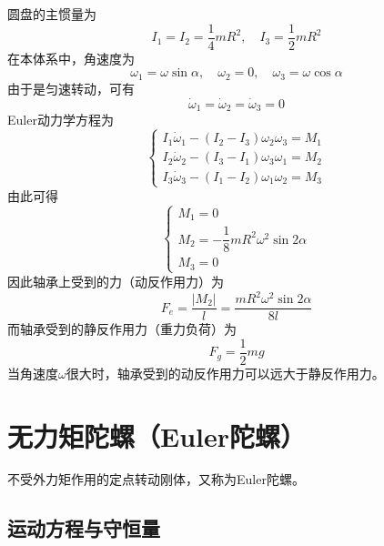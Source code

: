 \begin{solution}
圆盘的主惯量为
\begin{equation*}
	I_1 = I_2 = \frac14 mR^2,\quad I_3 = \frac12 mR^2
\end{equation*}
在本体系中，角速度为
\begin{equation*}
	\omega_1 = \omega \sin \alpha,\quad \omega_2 = 0,\quad \omega_3 = \omega \cos \alpha
\end{equation*}
由于是匀速转动，可有
\begin{equation*}
	\dot{\omega}_1 = \dot{\omega}_2 = \dot{\omega}_3 = 0
\end{equation*}
Euler动力学方程为
\begin{equation*}
	\begin{cases}
		I_1 \dot{\omega}_1 - (I_2-I_3)\omega_2 \omega_3 = M_1 \\
		I_2 \dot{\omega}_2 - (I_3-I_1)\omega_3 \omega_1 = M_2 \\
		I_3 \dot{\omega}_3 - (I_1-I_2)\omega_1 \omega_2 = M_3
	\end{cases}
\end{equation*}
由此可得
\begin{equation*}
	\begin{cases}
		M_1 = 0 \\
		M_2 = -\dfrac18 mR^2 \omega^2 \sin 2\alpha \\ 
		M_3 = 0
	\end{cases}
\end{equation*}
因此轴承上受到的力（动反作用力）为
\begin{equation*}
	F_e = \frac{|M_2|}{l} = \frac{mR^2 \omega^2 \sin 2\alpha}{8l}
\end{equation*}
而轴承受到的静反作用力（重力负荷）为
\begin{equation*}
	F_g = \frac12 mg
\end{equation*}
当角速度$\omega$很大时，轴承受到的动反作用力可以远大于静反作用力。
\end{solution}

\section{无力矩陀螺（Euler陀螺）}

不受外力矩作用的定点转动刚体，又称为{\heiti Euler陀螺}。

\subsection{运动方程与守恒量}

